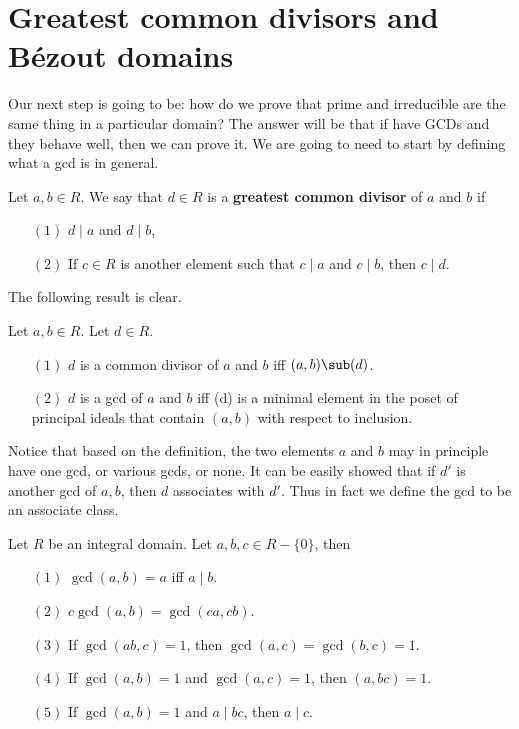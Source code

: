 \section{Greatest common divisors and B\'ezout domains}
Our next step is going to be: how do we prove that prime and irreducible are the same thing in a particular domain? The answer will be that if have GCDs and they behave well, then we can prove it. We are going to need to start by defining what a gcd is in general.
\begin{definition}
Let $a,b\in R$. We say that $d\in R$ is a \textbf{greatest common divisor} of $a$ and $b$ if 
\begin{itemize}
\item[$(1)$] $d\mid a$ and $d\mid b$,
\item[$(2)$] If $c\in R$ is another element such that $c\mid a$ and $c\mid b$, then $c\mid d$.
\end{itemize}
\end{definition}
The following result is clear.
\begin{lemma}\label{integral domian gcd char}
Let $a,b\in R$. Let $d\in R$.
\begin{itemize}
\item[$(1)$] $d$ is a common divisor of $a$ and $b$ iff $(a,b)\sub(d)$.
\item[$(2)$] $d$ is a gcd of $a$ and $b$ iff (d) is a minimal element in the poset of principal ideals that contain $(a,b)$ with respect to inclusion.
\end{itemize}
\end{lemma}
Notice that based on the definition, the two elements $a$ and $b$ may in principle have one gcd, or various gcds, or none. It can be easily showed that if $d'$ is another gcd of $a,b$, then $d$ associates with $d'$. Thus in fact we define the gcd to be an associate class.
\begin{lemma}\label{integral domian gcd lemma}
Let $R$ be an integral domain. Let $a,b,c\in R-\{0\}$, then
\begin{itemize}
\item[$(1)$] $\gcd(a,b)=a$ iff $a\mid b$.
\item[$(2)$] $c\gcd(a,b)=\gcd(ca,cb)$.
\item[$(3)$] If $\gcd(ab,c)=1$, then $\gcd(a,c)=\gcd(b,c)=1$.
\item[$(4)$] If $\gcd(a,b)=1$ and $\gcd(a,c)=1$, then $(a,bc)=1$.
\item[$(5)$] If $\gcd(a,b)=1$ and $a\mid bc$, then $a\mid c$.
\end{itemize}
\end{lemma}
